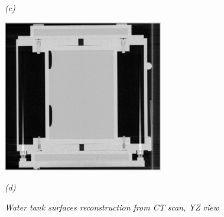 \begin{figure}[htb]
\begin{minipage}[t]{2.75in}
    \centerline{\emph{(c)}}
  \end{minipage}\medskip
  \begin{minipage}[t]{2.75in}
    \centering
    \centerline{\mbox{\includegraphics[width=2.75in]{data_extraction/images/surface_plane/saggital_ct_tilt.eps}}}
    \centerline{\emph{(d)}}
  \end{minipage}
  
  \caption{\emph{Water tank surfaces reconstruction from CT scan, YZ view}}
  \label{fig:ct_tank_surface_reconstruction_yz}

\end{figure}

